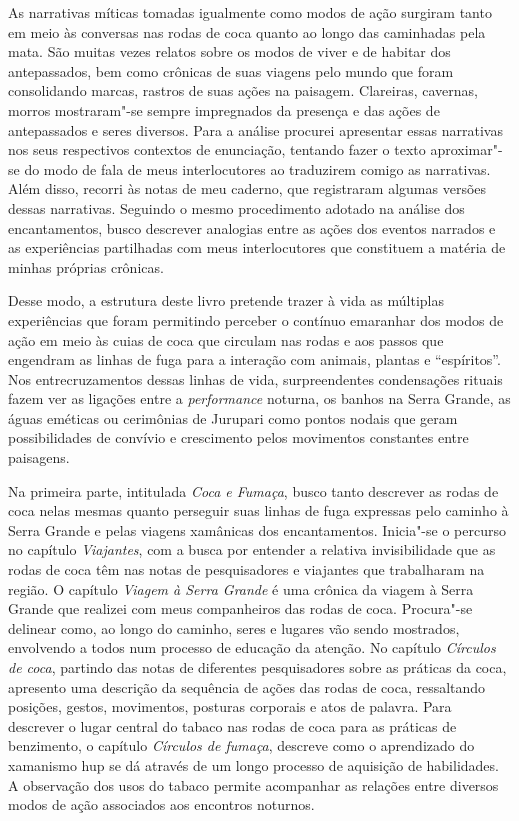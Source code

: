 As narrativas míticas tomadas igualmente como modos de ação surgiram
tanto em meio às conversas nas rodas de coca quanto ao longo das
caminhadas pela mata. São muitas vezes relatos sobre os modos de viver e
de habitar dos antepassados, bem como crônicas de suas viagens pelo
mundo que foram consolidando marcas, rastros de suas ações na paisagem.
Clareiras, cavernas, morros mostraram"-se sempre impregnados da presença
e das ações de antepassados e seres diversos. Para a análise procurei
apresentar essas narrativas nos seus respectivos contextos de
enunciação, tentando fazer o texto aproximar"-se do modo de fala de meus
interlocutores ao traduzirem comigo as narrativas. Além disso, recorri
às notas de meu caderno, que registraram algumas versões dessas
narrativas. Seguindo o mesmo procedimento adotado na análise dos
encantamentos, busco descrever analogias entre as ações dos eventos
narrados e as experiências partilhadas com meus interlocutores que
constituem a matéria de minhas próprias crônicas.

Desse modo, a estrutura deste livro pretende trazer à vida as múltiplas
experiências que foram permitindo perceber o contínuo emaranhar dos
modos de ação em meio às cuias de coca que circulam nas rodas e aos
passos que engendram as linhas de fuga para a interação com animais,
plantas e ``espíritos''. Nos entrecruzamentos dessas linhas de vida,
surpreendentes condensações rituais fazem ver as ligações entre a
\textit{performance} noturna, os banhos na Serra Grande, as águas eméticas
ou cerimônias de Jurupari como pontos nodais que geram possibilidades de
convívio e crescimento pelos movimentos constantes entre paisagens.

Na primeira parte, intitulada \textit{Coca e Fumaça}, busco tanto
descrever as rodas de coca nelas mesmas quanto perseguir suas linhas de
fuga expressas pelo caminho à Serra Grande e pelas viagens xamânicas dos
encantamentos. Inicia"-se o percurso no capítulo \textit{Viajantes}, com
a busca por entender a relativa invisibilidade que as rodas de coca têm
nas notas de pesquisadores e viajantes que trabalharam na região. O
capítulo \textit{Viagem à Serra Grande} é uma crônica da viagem à
Serra Grande que realizei com meus companheiros das rodas de coca.
Procura"-se delinear como, ao longo do caminho, seres e lugares vão sendo
mostrados, envolvendo a todos num processo de educação da atenção. No
capítulo \textit{Círculos de coca}, partindo das notas de diferentes
pesquisadores sobre as práticas da coca, apresento uma descrição da
sequência de ações das rodas de coca, ressaltando posições, gestos,
movimentos, posturas corporais e atos de palavra. Para descrever o lugar
central do tabaco nas rodas de coca para as práticas de benzimento, o
capítulo \textit{Círculos de fumaça}, descreve como o aprendizado do
xamanismo hup se dá através de um longo processo de aquisição de
habilidades. A observação dos usos do tabaco permite acompanhar as
relações entre diversos modos de ação associados aos encontros noturnos.

